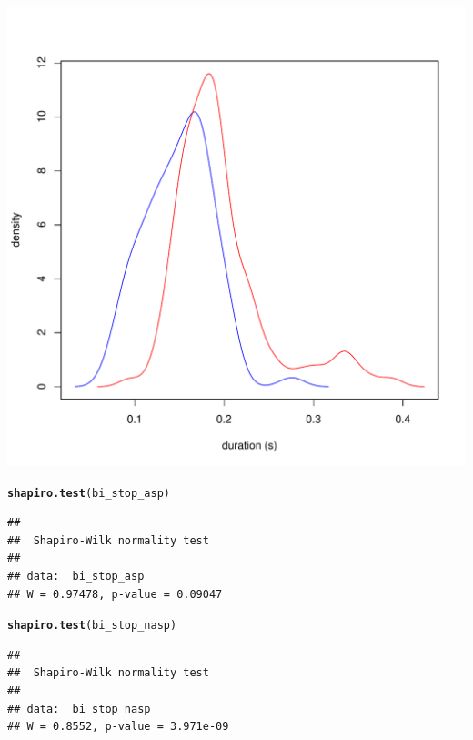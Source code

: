 \documentclass[a4paper,11pt]{article}\usepackage[]{graphicx}\usepackage[]{color}
\makeatletter
\def\maxwidth{ %
  \ifdim\Gin@nat@width>\linewidth
    \linewidth
  \else
    \Gin@nat@width
  \fi
}
\newcommand{\hlstd}[1]{\textcolor[rgb]{0.345,0.345,0.345}{#1}}%
\newcommand{\hlkwd}[1]{\textcolor[rgb]{0.737,0.353,0.396}{\textbf{#1}}}%
\newenvironment{kframe}{%
 \def\at@end@of@kframe{}%
 \ifinner\ifhmode%
  \def\at@end@of@kframe{\end{minipage}}%
  \begin{minipage}{\columnwidth}%
 \fi\fi%
 \def\FrameCommand##1{\hskip\@totalleftmargin \hskip-\fboxsep
 \colorbox{shadecolor}{##1}\hskip-\fboxsep
     \hskip-\linewidth \hskip-\@totalleftmargin \hskip\columnwidth}%
 \MakeFramed {\advance\hsize-\width
   \@totalleftmargin\z@ \linewidth\hsize
   \@setminipage}}%
 {\par\unskip\endMakeFramed%
 \at@end@of@kframe}
\newenvironment{knitrout}{}{} %
\makeatother
\begin{document}
\begin{knitrout}
{\centering \includegraphics[width=\maxwidth]{img/bi-stop-dens-1} 

}



\end{knitrout}

\begin{knitrout}
\color{fgcolor}\begin{kframe}
\begin{alltt}
\hlkwd{shapiro.test}\hlstd{(bi_stop_asp)}
\end{alltt}
\begin{verbatim}
## 
## 	Shapiro-Wilk normality test
## 
## data:  bi_stop_asp
## W = 0.97478, p-value = 0.09047
\end{verbatim}
\begin{alltt}
\hlkwd{shapiro.test}\hlstd{(bi_stop_nasp)}
\end{alltt}
\begin{verbatim}
## 
## 	Shapiro-Wilk normality test
## 
## data:  bi_stop_nasp
## W = 0.8552, p-value = 3.971e-09
\end{verbatim}
\end{kframe}
\end{knitrout}
\end{document}
